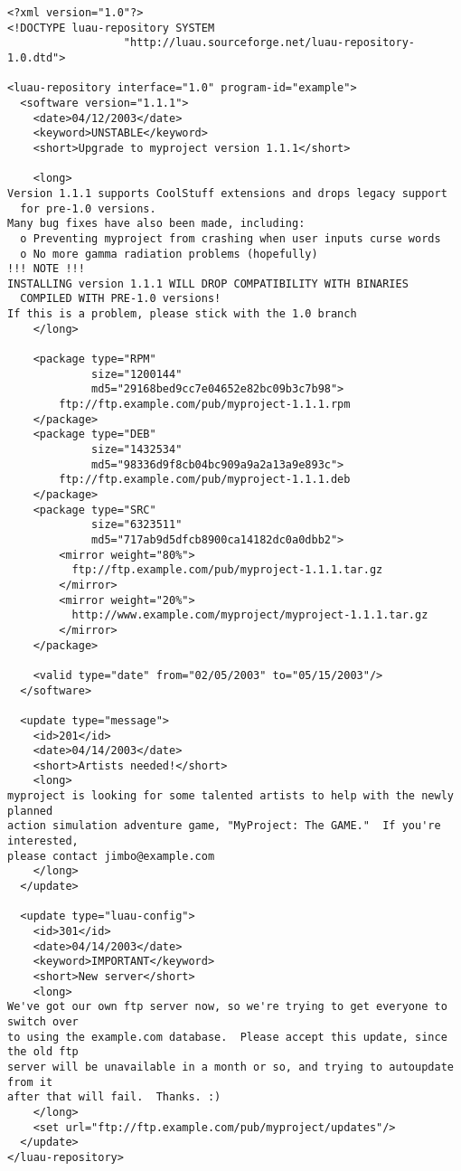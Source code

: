 \documentclass{report}
\begin{document}
{\footnotesize
\begin{verbatim}
<?xml version="1.0"?>
<!DOCTYPE luau-repository SYSTEM 
                  "http://luau.sourceforge.net/luau-repository-1.0.dtd">

<luau-repository interface="1.0" program-id="example">
  <software version="1.1.1">
    <date>04/12/2003</date>
    <keyword>UNSTABLE</keyword>
    <short>Upgrade to myproject version 1.1.1</short>
    
    <long>
Version 1.1.1 supports CoolStuff extensions and drops legacy support
  for pre-1.0 versions.
Many bug fixes have also been made, including:
  o Preventing myproject from crashing when user inputs curse words
  o No more gamma radiation problems (hopefully)
!!! NOTE !!!
INSTALLING version 1.1.1 WILL DROP COMPATIBILITY WITH BINARIES
  COMPILED WITH PRE-1.0 versions!
If this is a problem, please stick with the 1.0 branch
    </long>
    
    <package type="RPM" 
             size="1200144"
             md5="29168bed9cc7e04652e82bc09b3c7b98">
        ftp://ftp.example.com/pub/myproject-1.1.1.rpm
    </package>
    <package type="DEB" 
             size="1432534"
             md5="98336d9f8cb04bc909a9a2a13a9e893c">
        ftp://ftp.example.com/pub/myproject-1.1.1.deb
    </package>
    <package type="SRC" 
             size="6323511"
             md5="717ab9d5dfcb8900ca14182dc0a0dbb2">
        <mirror weight="80%">
          ftp://ftp.example.com/pub/myproject-1.1.1.tar.gz
        </mirror>
        <mirror weight="20%">
          http://www.example.com/myproject/myproject-1.1.1.tar.gz
        </mirror>
    </package>
    
    <valid type="date" from="02/05/2003" to="05/15/2003"/>
  </software>
  
  <update type="message">
    <id>201</id>
    <date>04/14/2003</date>
    <short>Artists needed!</short>
    <long>
myproject is looking for some talented artists to help with the newly planned
action simulation adventure game, "MyProject: The GAME."  If you're interested,
please contact jimbo@example.com
    </long>
  </update>
  
  <update type="luau-config">
    <id>301</id>
    <date>04/14/2003</date>
    <keyword>IMPORTANT</keyword>
    <short>New server</short>
    <long>
We've got our own ftp server now, so we're trying to get everyone to switch over
to using the example.com database.  Please accept this update, since the old ftp
server will be unavailable in a month or so, and trying to autoupdate from it
after that will fail.  Thanks. :)
    </long>
    <set url="ftp://ftp.example.com/pub/myproject/updates"/>
  </update>
</luau-repository>
\end{verbatim}
}
\end{document}
